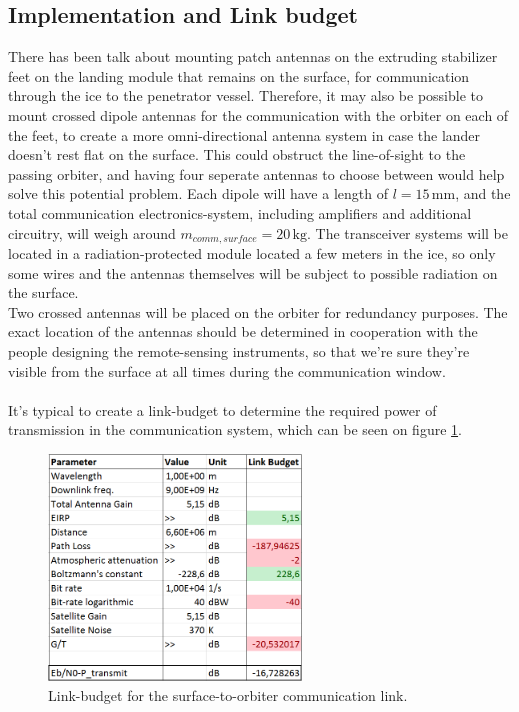 \subsection{Implementation and Link budget}
There has been talk about mounting patch antennas on the extruding stabilizer feet on the landing module that remains on the surface, for communication through the ice to the penetrator vessel. Therefore, it may also be possible to mount crossed dipole antennas for the communication with the orbiter on each of the feet, to create a more omni-directional antenna system in case the lander doesn't rest flat on the surface. This could obstruct the line-of-sight to the passing orbiter, and having four seperate antennas to choose between would help solve this potential problem. Each dipole will have a length of $l=15\,\mathrm{mm}$, and the total communication electronics-system, including amplifiers and additional circuitry, will weigh around $m_{comm,surface}=20\,\mathrm{kg}$. The transceiver systems will be located in a radiation-protected module located a few meters in the ice, so only some wires and the antennas themselves will be subject to possible radiation on the surface.\\
Two crossed antennas will be placed on the orbiter for redundancy purposes. The exact location of the antennas should be determined in cooperation with the people designing the remote-sensing instruments, so that we're sure they're visible from the surface at all times during the communication window.\\
\\
It's typical to create a link-budget to determine the required power of transmission in the communication system, which can be seen on figure \ref{fig:surfLink}.
\begin{figure}[!htb]
	\centering
	\includegraphics[width=0.6\textwidth]{figures/Rasmus/Link}
	\caption{Link-budget for the surface-to-orbiter communication link.
	\label{fig:surfLink}}
\end{figure}
